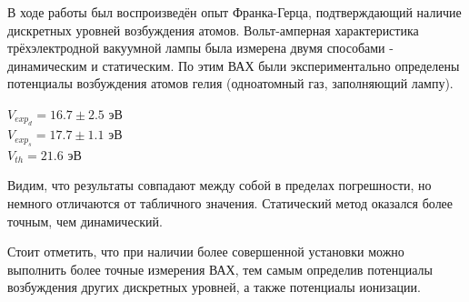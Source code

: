 \documentclass[a4paper, 12pt]{article}%
\begin{document}
В ходе работы был воспроизведён опыт Франка-Герца, подтверждающий наличие дискретных уровней возбуждения атомов. Вольт-амперная характеристика трёхэлектродной вакуумной лампы была измерена двумя способами - динамическим и статическим. По этим ВАХ были экспериментально определены потенциалы возбуждения атомов гелия (одноатомный газ, заполняющий лампу). 
\begin{center}
    $V_{exp_d} = 16.7 \pm 2.5$  эВ \\
    $V_{exp_s} = 17.7 \pm 1.1$ эВ \\
    $V_{th} = 21.6 $ эВ
\end{center}
Видим, что результаты совпадают между собой в пределах погрешности, но немного отличаются от табличного значения. Статический метод оказался более точным, чем динамический. \par
Стоит отметить, что при наличии более совершенной установки можно выполнить более точные измерения ВАХ, тем самым определив потенциалы возбуждения других дискретных уровней, а также потенциалы ионизации.
\end{document}
